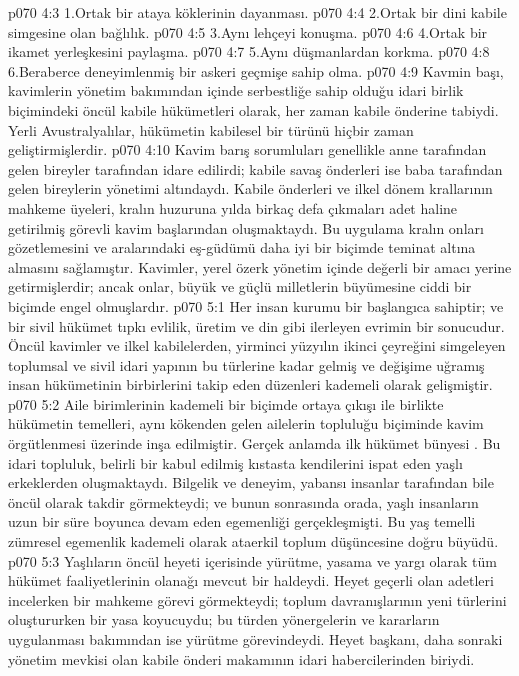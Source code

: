 \vs p070 4:3 1.\bibnobreakspace Ortak bir ataya köklerinin dayanması.
\vs p070 4:4 2.\bibnobreakspace Ortak bir dini kabile simgesine olan bağlılık.
\vs p070 4:5 3.\bibnobreakspace Aynı lehçeyi konuşma.
\vs p070 4:6 4.\bibnobreakspace Ortak bir ikamet yerleşkesini paylaşma.
\vs p070 4:7 5.\bibnobreakspace Aynı düşmanlardan korkma.
\vs p070 4:8 6.\bibnobreakspace Beraberce deneyimlenmiş bir askeri geçmişe sahip olma.
\vs p070 4:9 Kavmin başı, kavimlerin yönetim bakımından içinde serbestliğe sahip olduğu idari birlik biçimindeki öncül kabile hükümetleri olarak, her zaman kabile önderine tabiydi. Yerli Avustralyalılar, hükümetin kabilesel bir türünü hiçbir zaman geliştirmişlerdir.
\vs p070 4:10 Kavim barış sorumluları genellikle anne tarafından gelen bireyler tarafından idare edilirdi; kabile savaş önderleri ise baba tarafından gelen bireylerin yönetimi altındaydı. Kabile önderleri ve ilkel dönem krallarının mahkeme üyeleri, kralın huzuruna yılda birkaç defa çıkmaları adet haline getirilmiş görevli kavim başlarından oluşmaktaydı. Bu uygulama kralın onları gözetlemesini ve aralarındaki eş\hyp{}güdümü daha iyi bir biçimde teminat altına almasını sağlamıştır. Kavimler, yerel özerk yönetim içinde değerli bir amacı yerine getirmişlerdir; ancak onlar, büyük ve güçlü milletlerin büyümesine ciddi bir biçimde engel olmuşlardır.
\vs p070 5:1 Her insan kurumu bir başlangıca sahiptir; ve bir sivil hükümet tıpkı evlilik, üretim ve din gibi ilerleyen evrimin bir sonucudur. Öncül kavimler ve ilkel kabilelerden, yirminci yüzyılın ikinci çeyreğini simgeleyen toplumsal ve sivil idari yapının bu türlerine kadar gelmiş ve değişime uğramış insan hükümetinin birbirlerini takip eden düzenleri kademeli olarak gelişmiştir.
\vs p070 5:2 Aile birimlerinin kademeli bir biçimde ortaya çıkışı ile birlikte hükümetin temelleri, aynı kökenden gelen ailelerin topluluğu biçiminde kavim örgütlenmesi üzerinde inşa edilmiştir. Gerçek anlamda ilk hükümet bünyesi . Bu idari topluluk, belirli bir kabul edilmiş kıstasta kendilerini ispat eden yaşlı erkeklerden oluşmaktaydı. Bilgelik ve deneyim, yabansı insanlar tarafından bile öncül olarak takdir görmekteydi; ve bunun sonrasında orada, yaşlı insanların uzun bir süre boyunca devam eden egemenliği gerçekleşmişti. Bu yaş temelli zümresel egemenlik kademeli olarak ataerkil toplum düşüncesine doğru büyüdü.
\vs p070 5:3 Yaşlıların öncül heyeti içerisinde yürütme, yasama ve yargı olarak tüm hükümet faaliyetlerinin olanağı mevcut bir haldeydi. Heyet geçerli olan adetleri incelerken bir mahkeme görevi görmekteydi; toplum davranışlarının yeni türlerini oluştururken bir yasa koyucuydu; bu türden yönergelerin ve kararların uygulanması bakımından ise yürütme görevindeydi. Heyet başkanı, daha sonraki yönetim mevkisi olan kabile önderi makamının idari habercilerinden biriydi.
